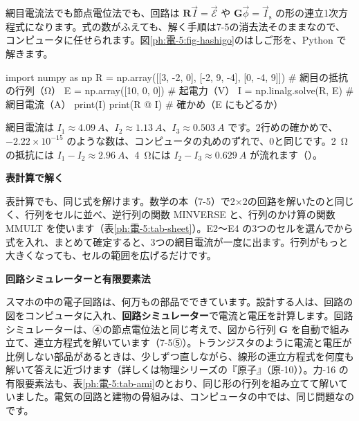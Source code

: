\leavevmode\label{ph:電-5:sec10}網目電流法でも節点電位法でも、回路は $\mathbf R\vec I=\vec{\mathcal E}$ や $\mathbf G\vec\phi=\vec I_{\mathrm s}$ の形の連立1次方程式になります。式の数がふえても、解く手順は7-5の消去法そのままなので、コンピュータに任せられます。図\ref{ph:電-5:fig-hashigo}のはしご形を、Python で解きます。
\begin{phcode}[Python]
import numpy as np
R = np.array([[3, -2, 0],
              [-2, 9, -4],
              [0, -4, 9]])        \# 網目の抵抗の行列（Ω）
E = np.array([10, 0, 0])          \# 起電力（V）
I = np.linalg.solve(R, E)         \# 網目電流（A）
print(I)
print(R @ I)                      \# 確かめ（E にもどるか）
\end{phcode}
\begin{phcodeout}[実行結果]
[4.08805031 1.13207547 0.50314465]
[ 1.00000000e+01 -2.22044605e-15  9.99200722e-16]
\end{phcodeout}
網目電流は $I_1\approx\qty{4.09}{A}$、$I_2\approx\qty{1.13}{A}$、$I_3\approx\qty{0.503}{A}$ です。2行めの確かめで、$-2.22\times10^{-15}$ のような数は、コンピュータの丸めのずれで、0と同じです。\qty{2}{\ohm}の抵抗には $I_1-I_2\approx\qty{2.96}{A}$、\qty{4}{\ohm}には $I_2-I_3\approx\qty{0.629}{A}$ が流れます（）。

\noindent\textbf{表計算で解く}\par\nobreak
表計算でも、同じ式を解けます。数学の本（7-5）で2×2の回路を解いたのと同じく、行列をセルに並べ、逆行列の関数 MINVERSE と、行列のかけ算の関数 MMULT を使います（表\ref{ph:電-5:tab-sheet}）。E2〜E4 の3つのセルを選んでから式を入れ、まとめて確定すると、3つの網目電流が一度に出ます。行列がもっと大きくなっても、セルの範囲を広げるだけです。
\begin{bkcenter}
\label{ph:電-5:tab-sheet}
\end{bkcenter}

\noindent\textbf{回路シミュレーターと有限要素法}\par\nobreak
スマホの中の電子回路は、何万もの部品でできています。設計する人は、回路の図をコンピュータに入れ、\textbf{回路シミュレーター}で電流と電圧を計算します。回路シミュレーターは、④の節点電位法と同じ考えで、図から行列 $\mathbf G$ を自動で組み立て、連立方程式を解いています（7-5⑤）。トランジスタのように電流と電圧が比例しない部品があるときは、少しずつ直しながら、線形の連立方程式を何度も解いて答えに近づけます（詳しくは物理シリーズの『原子』（原-10））。力-16 の有限要素法も、表\ref{ph:電-5:tab-ami}のとおり、同じ形の行列を組み立てて解いていました。電気の回路と建物の骨組みは、コンピュータの中では、同じ問題なのです。

